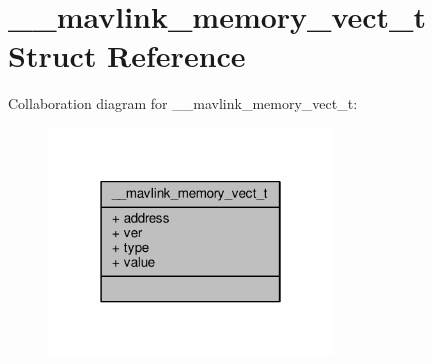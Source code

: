 \hypertarget{struct____mavlink__memory__vect__t}{\section{\+\_\+\+\_\+mavlink\+\_\+memory\+\_\+vect\+\_\+t Struct Reference}
\label{struct____mavlink__memory__vect__t}
}


Collaboration diagram for \+\_\+\+\_\+mavlink\+\_\+memory\+\_\+vect\+\_\+t\+:
\nopagebreak
\begin{figure}[H]
\begin{center}
\leavevmode
\includegraphics[width=214pt]{struct____mavlink__memory__vect__t__coll__graph}
\end{center}
\end{figure}

